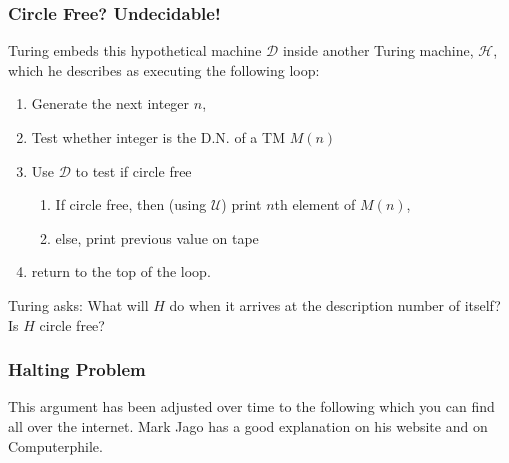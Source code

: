 \documentclass{beamer}
\begin{document}
\begin{frame}
	\frametitle{Circle Free? Undecidable!}

	Turing embeds this hypothetical machine $\mathcal{D}$ inside another Turing machine, $\mathcal{H}$, which he describes as executing the following loop: 

	\vspace{0.2cm}

	\begin{enumerate}
		\item Generate the next integer $n$, 
		\item Test whether integer is the D.N. of a TM $M(n)$
		\item Use $\mathcal{D}$ to test if circle free 
			\begin{enumerate}
				\item If circle free, then (using $\mathcal{U}$) print $n$th element of $M(n)$,  
				\item else, print previous value on tape
			\end{enumerate}
		\item return to the top of the loop. 
	\end{enumerate}

	\vspace{0.2cm}

	Turing asks: What will $H$ do when it arrives at the description number of itself? Is $H$ circle free?  %

	\vspace{2cm}
	
\end{frame}


\begin{frame}
	\frametitle{Halting Problem}
	
	This argument has been adjusted over time to the following which you can find all over the internet. Mark Jago has a good explanation on his website and on Computerphile. 
	\vspace{6cm}


\end{frame}
\end{document}

